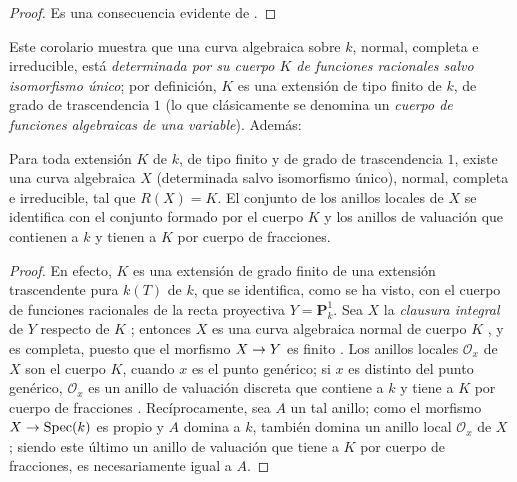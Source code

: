 \documentclass[oneside,10pt]{amsart}
\makeatletter
\newcommand{\ega@arrow}[2]{\mathchoice{#1}{#2}{#2}{#2}}
\renewcommand{\to}{\ega@arrow{\longrightarrow}{\rightarrow}}
\let\EGAOriginalLabel\label
\renewcommand{\label}[1]{\phantomsection\EGAOriginalLabel{#1}}
\makeatother
\begin{document}
\begin{proof}
Es una consecuencia evidente de .
\end{proof}

\begin{env}[7.4.17]
\label{II.7.4.17-fr}
Este corolario  muestra que una curva algebraica sobre $k$, normal, completa e irreducible, está \emph{determinada por su cuerpo $K$ de funciones racionales salvo isomorfismo único};
por definición, $K$ es una extensión de tipo finito de $k$, de grado de trascendencia $1$ (lo que clásicamente se denomina un \emph{cuerpo de funciones algebraicas de una variable}).
Además:
\end{env}

\begin{proposition}[7.4.18]
\label{II.7.4.18-fr}
Para toda extensión $K$ de $k$, de tipo finito y de grado de trascendencia $1$, existe una curva algebraica $X$ (determinada salvo isomorfismo único), normal, completa e irreducible, tal que $R(X)=K$.
El conjunto de los anillos locales de $X$ se identifica  con el conjunto formado por el cuerpo $K$ y los anillos de valuación que contienen a $k$ y tienen a $K$ por cuerpo de fracciones.
\end{proposition}

\begin{proof}
En efecto, $K$ es una extensión de grado finito de una extensión trascendente pura $k(T)$ de $k$, que se identifica, como se ha visto, con el cuerpo de funciones racionales de la recta proyectiva $Y=\mathbf{P}_k^1$.
Sea $X$ la \emph{clausura integral} de $Y$ respecto de $K$ ;
entonces $X$ es una curva algebraica normal de cuerpo $K$ , y es completa, puesto que el morfismo $X\to Y$ es finito .
Los anillos locales $\mathcal{O}_x$ de $X$ son el cuerpo $K$, cuando $x$ es el punto genérico; si $x$ es distinto del punto genérico, $\mathcal{O}_x$ es un anillo de valuación discreta que contiene a $k$ y tiene a $K$ por cuerpo de fracciones .
Recíprocamente, sea $A$ un tal anillo;
como el morfismo $X\to\operatorname{Spec}(k)$ es propio y $A$ domina a $k$, también domina un anillo local $\mathcal{O}_x$ de $X$ ;
siendo este último un anillo de valuación que tiene a $K$ por cuerpo de fracciones, es necesariamente igual a $A$.
\end{proof}
\end{document}
